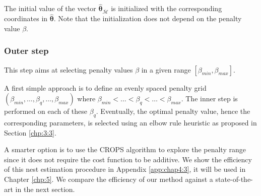 The initial value of the vector $\widehat{\bm\theta}_{\overline{\mathcal{M}}}$ is initialized with the corresponding coordinates in $\widehat{\bm\theta}$. Note that the initialization does not depend on the penalty value $\beta$. 


\subsubsection{Outer step}

This step aims at selecting penalty values $\beta$ in a given range $[\beta_{min},\beta_{max}]$.

A first simple approach is to define an evenly spaced penalty grid $(\beta_{min},\dots,\beta_q,\dots,\beta_{max})$ where $\beta_{min}<\dots<\beta_{q}<\dots<\beta_{max}$. The inner step is performed on each of these $\beta_{q}$. Eventually, the optimal penalty value, hence the corresponding parameters, is selected using an elbow rule heuristic as proposed in Section \ref{chp:3:3}.

A smarter option is to use the CROPS algorithm to explore the penalty range since it does not require the cost function to be additive.  
\newline
\newline
We show the efficiency of this nest estimation procedure in Appendix \ref{app:chap4:3}, it will be used in Chapter \ref{chp:5}. We compare the efficiency of our method against a state-of-the-art in the next section.


